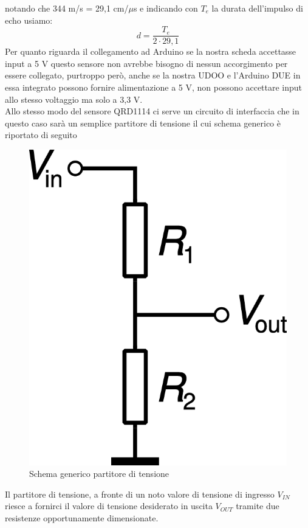 notando che 344 m/s = 29,1 cm/$\mu$s e indicando con $T_e$ la durata dell'impulso 
di echo usiamo:
$$d=\frac{T_e}{2\cdot29,1}$$
Per quanto riguarda il collegamento ad Arduino se la nostra scheda accettasse 
input a 5 V questo sensore non avrebbe bisogno di nessun accorgimento per essere
 collegato, purtroppo però, anche se la nostra UDOO 
e l'Arduino DUE in essa integrato possono fornire alimentazione a 5 V, non possono 
accettare input allo stesso voltaggio ma solo a 3,3 V. 
\\Allo stesso modo del sensore QRD1114 ci serve un circuito di interfaccia che 
in questo caso sarà un semplice partitore di tensione il cui schema generico è 
riportato di seguito

\begin{figure}[!htb] \center
\includegraphics[scale=0.6]{immagini/Voltage_divider.png}
\caption{Schema generico partitore di tensione} 
\end{figure}

Il partitore di tensione, a fronte di un noto valore di tensione di ingresso 
$V_{IN}$ riesce a fornirci il valore di tensione desiderato in uscita $V_{OUT}$ 
tramite due resistenze opportunamente dimensionate. 

